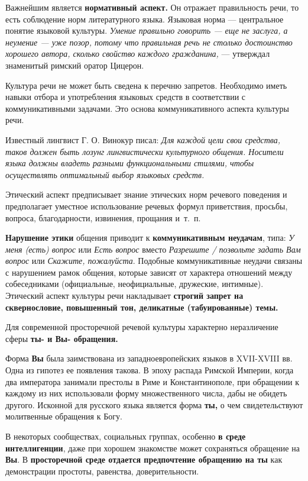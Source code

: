 Важнейшим является \textbf{нормативный аспект.} Он отражает правильность речи, то есть соблюдение норм литературного языка.
Языковая норма --- центральное понятие языковой культуры.
\textit{Умение правильно говорить --- еще не заслуга, а неумение --- уже позор, потому что правильная речь не столько достоинство хорошего автора, сколько свойство каждого гражданина,} --- утверждал знаменитый римский оратор Цицерон.

Культура речи не может быть сведена к перечню запретов.
Необходимо иметь навыки отбора и употребления языковых средств в соответствии с коммуникативными задачами.
Это основа коммуникативного аспекта культуры речи.

Известный лингвист Г. О. Винокур писал: \textit{Для каждой цели свои средства, таков должен быть лозунг лингвистически культурного общения.
Носители языка должны владеть разными функциональными стилями, чтобы осуществлять оптимальный выбор языковых средств.}

Этический аспект предписывает знание этических норм речевого поведения и предполагает уместное использование речевых формул приветствия, просьбы, вопроса, благодарности, извинения, прощания и~т.~п.

\textbf{Нарушение этики} общения приводит к \textbf{коммуникативным неудачам}, типа: \textit{У меня (есть) вопрос} или \textit{Есть вопрос} вместо \textit{Разрешите / позвольте задать Вам вопрос} или \textit{Скажите, пожалуйста}.
Подобные коммуникативные неудачи связаны с нарушением рамок общения, которые зависят от характера отношений между собеседниками (официальные, неофициальные, дружеские, интимные). Этический аспект культуры речи накладывает \textbf{строгий запрет на сквернословие, повышенный тон, деликатные (табуированные) темы.}

Для современной просторечной речевой культуры характерно неразличение сферы \textbf{ты- и Вы- обращения.}

Форма \textbf{Вы} была заимствована из западноевропейских языков в XVII-XVIII вв.
Одна из гипотез ее появления такова.
В эпоху распада Римской Империи, когда два императора занимали престолы в Риме и Константинополе, при обращении к каждому из них использовали форму множественного числа, дабы не обидеть другого. Исконной для русского языка является форма \textbf{ты,} о чем свидетельствуют молитвенные обращения к Богу.

В некоторых сообществах, социальных группах, особенно \textbf{в среде интеллигенции}, даже при хорошем знакомстве может сохраняться обращение на \textbf{Вы}. В \textbf{просторечной среде отдается предпочтение обращению на ты} как демонстрации простоты, равенства, доверительности.

